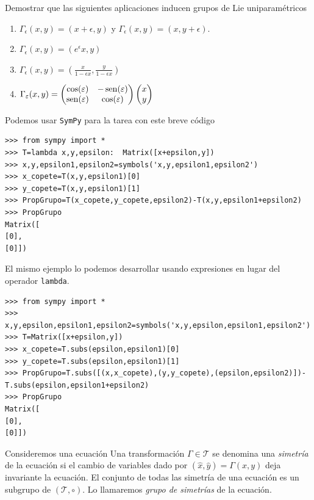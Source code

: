 \begin{ejemplo} Demostrar que las siguientes aplicaciones inducen grupos de Lie uniparamétricos
\begin{enumerate}
\item $\Gamma_{\epsilon}(x,y)=(x+\epsilon,y)$ y $\Gamma_{\epsilon}(x,y)=(x,y+\epsilon)$.
\item $\Gamma_{\epsilon}(x,y)=(e^{\epsilon}x,y)$
\item$\Gamma_{\epsilon}(x,y)=\left(\frac{x}{1-\epsilon x},\frac{y}{1-\epsilon x} \right)$
\item$\Gamma_{\varepsilon}(x,y)=\begin{pmatrix} \cos(\varepsilon) & -\operatorname{sen}(\varepsilon)
\\ \operatorname{sen}(\varepsilon) & \cos(\varepsilon)
\end{pmatrix} \begin{pmatrix} x\\ y
\end{pmatrix}
$
\end{enumerate}
\end{ejemplo}


Podemos usar \texttt{SymPy} para la tarea con este breve código
\begin{lstlisting}
>>> from sympy import *
>>> T=lambda x,y,epsilon:  Matrix([x+epsilon,y])
>>> x,y,epsilon1,epsilon2=symbols('x,y,epsilon1,epsilon2')
>>> x_copete=T(x,y,epsilon1)[0]
>>> y_copete=T(x,y,epsilon1)[1]
>>> PropGrupo=T(x_copete,y_copete,epsilon2)-T(x,y,epsilon1+epsilon2)
>>> PropGrupo
Matrix([
[0],
[0]])
\end{lstlisting}


El mismo ejemplo lo podemos desarrollar usando expresiones en lugar del operador \texttt{lambda}.
\begin{lstlisting}
>>> from sympy import *
>>> x,y,epsilon,epsilon1,epsilon2=symbols('x,y,epsilon,epsilon1,epsilon2')
>>> T=Matrix([x+epsilon,y])
>>> x_copete=T.subs(epsilon,epsilon1)[0]
>>> y_copete=T.subs(epsilon,epsilon1)[1]
>>> PropGrupo=T.subs([(x,x_copete),(y,y_copete),(epsilon,epsilon2)])-T.subs(epsilon,epsilon1+epsilon2)
>>> PropGrupo
Matrix([
[0],
[0]])
\end{lstlisting}


\begin{definicion}
 Consideremos una ecuación
Una transformación $\Gamma\in \mathscr{T}$ se denomina una \emph{simetría} de la ecuación si el cambio de variables dado por $(\hat{x},\hat{y})=\Gamma(x,y)$ deja invariante  la ecuación.   El conjunto de todas las simetría de una ecuación es un subgrupo de  $( \mathscr{T},\circ)$. Lo llamaremos \emph{grupo de simetrías} de la ecuación.

\end{definicion}



